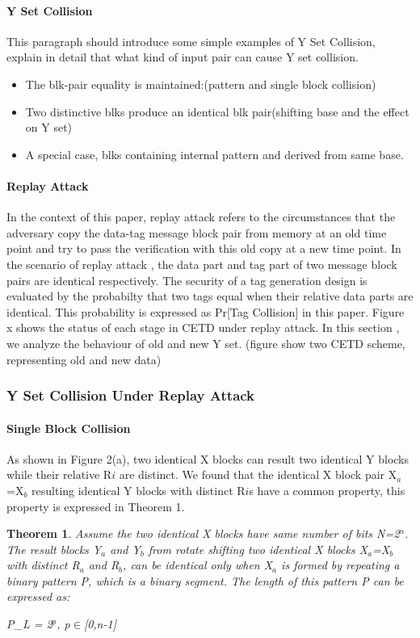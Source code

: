 \documentclass{article}
\newtheorem{theorem}{Theorem}[section]
\begin{document}
\paragraph{Y Set Collision}
This paragraph should introduce some simple examples of Y Set Collision,
explain in detail that what kind of input pair can cause Y set collision.
\begin{itemize} 
	\item The blk-pair equality is maintained:(pattern and single
block collision) 
	\item Two distinctive blks produce an identical blk
pair(shifting base and the effect on Y set) 
	\item A special case, blks
containing internal pattern and derived from same base.  
\end{itemize}
\paragraph{Replay Attack} 
In the context of this paper, replay attack refers to the circumstances that the
adversary copy the data-tag message block pair from
memory at an old time point and try to pass the verification with this old copy
at a new time point. In the scenario of replay attack , the data part and tag
part of two message block pairs are identical respectively. 
The security of a
tag generation design is evaluated by the probabilty that two tags equal when
their relative data parts are identical. This probability is expressed as
Pr[Tag Collision] in this paper.  Figure x shows the status of each stage in
CETD under replay attack. In this section , we analyze the behaviour of old and
new Y set. (figure show two CETD scheme, representing old and new data) 
\subsubsection{Y Set Collision Under Replay Attack}
\paragraph{Single Block Collision}
As shown in Figure 2(a), two identical X blocks can result two identical Y blocks while their relative R$i$ are distinct. We found that the identical X block pair X$_a$=X$_b$ resulting identical Y blocks with distinct R$i$s have a common property, this property is expressed in Theorem 1.
\begin{theorem}
Assume the two identical X blocks have same number of bits N=2$^n$. The result blocks Y$_a$ and Y$_b$ from rotate shifting two identical X blocks X$_a$=X$_b$ with distinct R$_a$ and R$_b$, can be identical only when X$_a$ is formed by repeating a binary pattern P, which is a binary segment. The length of this pattern P can be expressed as:

	P\_L = 2$^p$, p$\in$[0,n-1]
\end{theorem}
\end{document}
